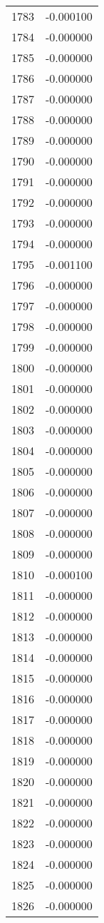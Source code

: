 \documentclass[12pt]{article}
\begin{document}
\begin{longtable}{@{}cc@{}}
1783 & -0.000100 \\
1784 & -0.000000 \\
1785 & -0.000000 \\
1786 & -0.000000 \\
1787 & -0.000000 \\
1788 & -0.000000 \\
1789 & -0.000000 \\
1790 & -0.000000 \\
1791 & -0.000000 \\
1792 & -0.000000 \\
1793 & -0.000000 \\
1794 & -0.000000 \\
1795 & -0.001100 \\
1796 & -0.000000 \\
1797 & -0.000000 \\
1798 & -0.000000 \\
1799 & -0.000000 \\
1800 & -0.000000 \\
1801 & -0.000000 \\
1802 & -0.000000 \\
1803 & -0.000000 \\
1804 & -0.000000 \\
1805 & -0.000000 \\
1806 & -0.000000 \\
1807 & -0.000000 \\
1808 & -0.000000 \\
1809 & -0.000000 \\
1810 & -0.000100 \\
1811 & -0.000000 \\
1812 & -0.000000 \\
1813 & -0.000000 \\
1814 & -0.000000 \\
1815 & -0.000000 \\
1816 & -0.000000 \\
1817 & -0.000000 \\
1818 & -0.000000 \\
1819 & -0.000000 \\
1820 & -0.000000 \\
1821 & -0.000000 \\
1822 & -0.000000 \\
1823 & -0.000000 \\
1824 & -0.000000 \\
1825 & -0.000000 \\
1826 & -0.000000 \\

\end{longtable}
\end{document}
